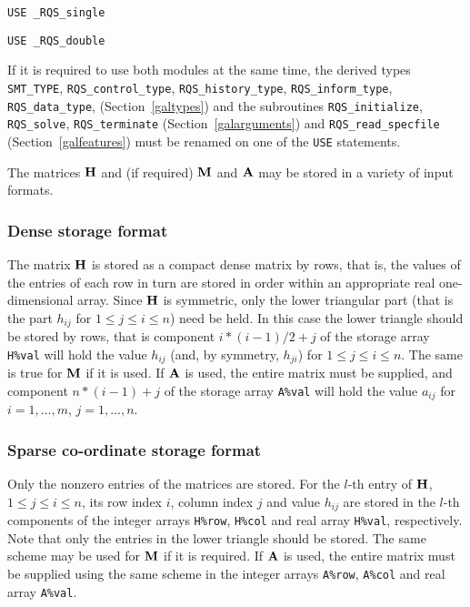 \documentclass{galahad}
\newcommand{\packagename}{RQS}
\newcommand{\fullpackagename}{\libraryname\_\packagename}
\begin{document}
\hskip0.5in {\tt USE \fullpackagename\_single}

\medskip{}

\hskip0.5in {\tt USE  \fullpackagename\_double}

\medskip

\noindent
If it is required to use both modules at the same time, the derived types
{\tt SMT\_TYPE},
{\tt \packagename\_control\_type},
{\tt \packagename\_history\_\-type},
{\tt \packagename\_inform\_type},
{\tt \packagename\_data\_type},
(Section~\ref{galtypes})
and the subroutines
{\tt \packagename\_initialize},
{\tt \packagename\_solve}, {\tt \packagename\_\-terminate}
(Section~\ref{galarguments})
and
{\tt \packagename\_read\_specfile}
(Section~\ref{galfeatures})
must be renamed on one of the {\tt USE} statements.


\galmatrix
The matrices ${\mathbf{H}}$ and (if required) ${\mathbf{M}}$ and ${\mathbf{A}}$
may be stored in a variety of input formats.

\subsubsection{Dense storage format}\label{dense}
The matrix ${\mathbf{H}}$ is stored as a compact
dense matrix by rows, that is, the values of the entries of each row in turn are
stored in order within an appropriate real one-dimensional array.
Since ${\mathbf{H}}$ is symmetric, only the lower triangular part (that is the part
$h_{ij}$ for $1 \leq j \leq i \leq n$) need be held. In this case
the lower triangle should be stored by rows, that is
component $i \ast (i-1)/2 + j$ of the storage array {\tt H\%val}
will hold the value $h_{ij}$ (and, by symmetry, $h_{ji}$)
for $1 \leq j \leq i \leq n$. The same is true for ${\mathbf{M}}$ if it is used.
If ${\mathbf{A}}$ is used, the entire matrix must be supplied, and
component $n \ast (i-1) + j$ of the storage array {\tt A\%val} will hold the
value $a_{ij}$ for $i = 1, \ldots , m$, $j = 1, \ldots , n$.

\subsubsection{Sparse co-ordinate storage format}\label{coordinate}
Only the nonzero entries of the matrices are stored.
For the $l$-th entry of ${\mathbf{H}}$, $1 \leq j \leq i \leq n$,
its row index $i$, column index $j$ and value $h_{ij}$
are stored in the $l$-th components of the integer arrays {\tt H\%row},
{\tt H\%col} and real array {\tt H\%val}, respectively.
Note that only the entries in the lower triangle should be stored.
The same scheme may be used for ${\mathbf{M}}$ if it is required.
If ${\mathbf{A}}$ is used, the entire matrix must be supplied using the same scheme
in the integer arrays {\tt A\%row}, {\tt A\%col} and real array {\tt A\%val}.
\end{document}
